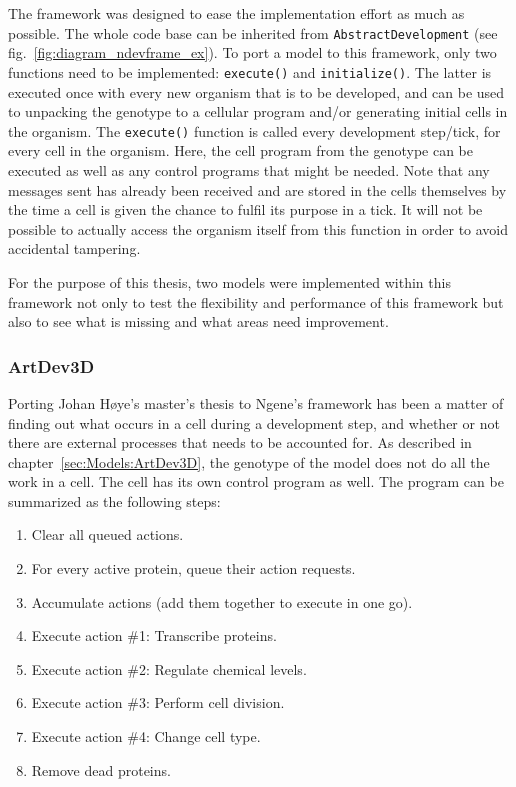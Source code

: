The framework was designed to ease the implementation effort as much as possible. The whole code base can be inherited from \texttt{AbstractDevelopment} (see fig.~\ref{fig:diagram_ndevframe_ex}). To port a model to this framework, only two functions need to be implemented: \texttt{execute()} and \texttt{initialize()}. The latter is executed once with every new organism that is to be developed, and can be used to unpacking the genotype to a cellular program and/or generating initial cells in the organism. The \texttt{execute()} function is called every development step/tick, for every cell in the organism. Here, the cell program from the genotype can be executed as well as any control programs that might be needed. Note that any messages sent has already been received and are stored in the cells themselves by the time a cell is given the chance to fulfil its purpose in a tick. It will not be possible to actually access the organism itself from this function in order to avoid accidental tampering.

For the purpose of this thesis, two models were implemented within this framework not only to test the flexibility and performance of this framework but also to see what is missing and what areas need improvement.


\subsubsection{ArtDev3D}
\label{sec:Implementation:ArtDev3D}
Porting Johan H{\o}ye's master's thesis\cite{hoye2006} to Ngene's framework has been a matter of finding out what occurs in a cell during a development step, and whether or not there are external processes that needs to be accounted for. As described in chapter~\ref{sec:Models:ArtDev3D}, the genotype of the model does not do all the work in a cell. The cell has its own control program as well. The program can be summarized as the following steps:

\begin{enumerate}
	\itemsep=0pt
	\item Clear all queued actions.
	\item For every active protein, queue their action requests.
	\item Accumulate actions (add them together to execute in one go).
	\item Execute action \#1: Transcribe proteins.
	\item Execute action \#2: Regulate chemical levels.
	\item Execute action \#3: Perform cell division.
	\item Execute action \#4: Change cell type.
	\item Remove dead proteins.
\end{enumerate}

